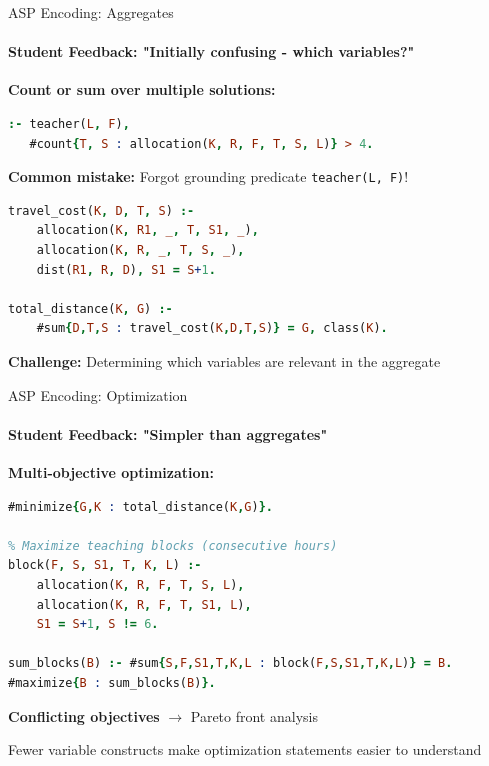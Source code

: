 \documentclass[aspectratio=169]{beamer}
\begin{document}
\begin{frame}[fragile]{ASP Encoding: Aggregates}
    \framesubtitle{Student Feedback: "Initially confusing - which variables?"}

    \textbf{Count or sum over multiple solutions:}

    \begin{lstlisting}[language=Prolog]
% Teacher should have at least 1 day off (home office)
:- teacher(L, F),
   #count{T, S : allocation(K, R, F, T, S, L)} > 4.
    \end{lstlisting}

    \vspace{0.3cm}

    \textbf{Common mistake:} Forgot grounding predicate \texttt{teacher(L, F)}!

    \vspace{0.5cm}

    \begin{lstlisting}[language=Prolog]
% Calculate total travel distance
travel_cost(K, D, T, S) :-
    allocation(K, R1, _, T, S1, _),
    allocation(K, R, _, T, S, _),
    dist(R1, R, D), S1 = S+1.

total_distance(K, G) :-
    #sum{D,T,S : travel_cost(K,D,T,S)} = G, class(K).
    \end{lstlisting}

    \textbf{Challenge:} Determining which variables are relevant in the aggregate
\end{frame}

\begin{frame}[fragile]{ASP Encoding: Optimization}
    \framesubtitle{Student Feedback: "Simpler than aggregates"}

    \textbf{Multi-objective optimization:}

    \begin{lstlisting}[language=Prolog]
% Minimize student travel
#minimize{G,K : total_distance(K,G)}.

% Maximize teaching blocks (consecutive hours)
block(F, S, S1, T, K, L) :-
    allocation(K, R, F, T, S, L),
    allocation(K, R, F, T, S1, L),
    S1 = S+1, S != 6.

sum_blocks(B) :- #sum{S,F,S1,T,K,L : block(F,S,S1,T,K,L)} = B.
#maximize{B : sum_blocks(B)}.
    \end{lstlisting}

    \vspace{0.5cm}

    \textbf{Conflicting objectives} $\rightarrow$ Pareto front analysis

    \vspace{0.3cm}

    \centering
    \small Fewer variable constructs make optimization statements easier to understand
\end{frame}
\end{document}
